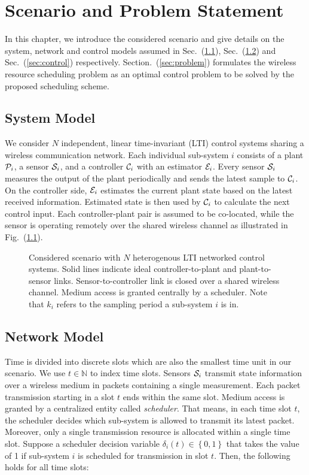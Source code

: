 \chapter{Scenario and Problem Statement}

In this chapter, we introduce the considered scenario and give details on the
system, network and control models assumed in Sec.~(\ref{sec:system}),
Sec.~(\ref{sec:network}) and Sec.~(\ref{sec:control}) respectively.
Section.~(\ref{sec:problem}) formulates the wireless resource scheduling problem
as an optimal control problem to be solved by the proposed scheduling scheme.

\section{System Model} \label{sec:system}
We consider $N$ independent, linear time-invariant (LTI) control systems sharing
a wireless communication network. Each individual sub-system $i$ consists of a
plant $\mathcal{P}_i$, a sensor $\mathcal{S}_i$, and a controller $\mathcal{C}_i$ with an
estimator $\mathcal{E}_i$. Every sensor $\mathcal{S}_i$ measures the output of the plant
periodically and sends the latest sample to $\mathcal{C}_i$. On the controller
side, $\mathcal{E}_i$ estimates the current plant state based on the latest
received information. Estimated state is then used by $\mathcal{C}_i$ to calculate
the next control input. Each controller-plant pair is assumed to be co-located,
while the sensor is operating remotely over the shared wireless channel as
illustrated in Fig.~(\ref{fig:scenario}).

\begin{figure}[htb]
  \centering
  \resizebox*{.8\columnwidth}{!}{} \caption[Scheme of
  $N$ sub-systems sharing a wireless communication medium]{Considered scenario
  with $N$ heterogenous LTI networked control systems. Solid lines indicate
  ideal controller-to-plant and plant-to-sensor links. Sensor-to-controller link
  is closed over a shared wireless channel. Medium access is granted centrally
  by a scheduler. Note that $k_i$ refers to the sampling period a sub-system $i$
  is in.}
  \label{fig:scenario}
\end{figure}

\section{Network Model} \label{sec:network}
Time is divided into discrete slots which are also the smallest time unit in our
scenario. We use $t \in \mathbb{N}$ to index time slots. Sensors $\mathcal{S}_i$
transmit state information over a wireless medium in packets containing a single
measurement. Each packet transmission starting in a slot $t$ ends within the
same slot. Medium access is granted by a centralized entity called
\textit{scheduler}. That means, in each time slot $t$, the scheduler decides
which sub-system is allowed to transmit its latest packet. Moreover, only a
single transmission resource is allocated within a single time slot. Suppose a
scheduler decision variable $\delta_i(t) \in \left\{0,1\right\}$ that takes the
value of 1 if sub-system $i$ is scheduled for transmission in slot $t$.
Then, the following holds for all time slots:


